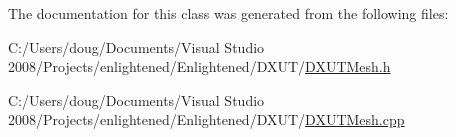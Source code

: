 The documentation for this class was generated from the following files:\begin{DoxyCompactItemize}
\item 
C:/Users/doug/Documents/Visual Studio 2008/Projects/enlightened/Enlightened/DXUT/\hyperlink{_d_x_u_t_mesh_8h}{DXUTMesh.h}\item 
C:/Users/doug/Documents/Visual Studio 2008/Projects/enlightened/Enlightened/DXUT/\hyperlink{_d_x_u_t_mesh_8cpp}{DXUTMesh.cpp}\end{DoxyCompactItemize}
